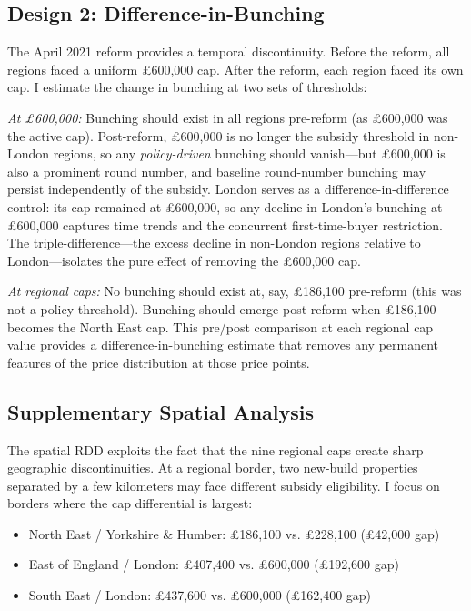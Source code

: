 \documentclass[12pt]{article}
\begin{document}
\subsection{Design 2: Difference-in-Bunching}

The April 2021 reform provides a temporal discontinuity. Before the reform, all regions faced a uniform \pounds600,000 cap. After the reform, each region faced its own cap. I estimate the change in bunching at two sets of thresholds:

\textit{At \pounds600,000:} Bunching should exist in all regions pre-reform (as \pounds600,000 was the active cap). Post-reform, \pounds600,000 is no longer the subsidy threshold in non-London regions, so any \textit{policy-driven} bunching should vanish---but \pounds600,000 is also a prominent round number, and baseline round-number bunching may persist independently of the subsidy. London serves as a difference-in-difference control: its cap remained at \pounds600,000, so any decline in London's bunching at \pounds600,000 captures time trends and the concurrent first-time-buyer restriction. The triple-difference---the excess decline in non-London regions relative to London---isolates the pure effect of removing the \pounds600,000 cap.

\textit{At regional caps:} No bunching should exist at, say, \pounds186,100 pre-reform (this was not a policy threshold). Bunching should emerge post-reform when \pounds186,100 becomes the North East cap. This pre/post comparison at each regional cap value provides a difference-in-bunching estimate that removes any permanent features of the price distribution at those price points.

\subsection{Supplementary Spatial Analysis}

The spatial RDD exploits the fact that the nine regional caps create sharp geographic discontinuities. At a regional border, two new-build properties separated by a few kilometers may face different subsidy eligibility. I focus on borders where the cap differential is largest:

\begin{itemize}
\item North East / Yorkshire \& Humber: \pounds186,100 vs. \pounds228,100 (\pounds42,000 gap)
\item East of England / London: \pounds407,400 vs. \pounds600,000 (\pounds192,600 gap)
\item South East / London: \pounds437,600 vs. \pounds600,000 (\pounds162,400 gap)
\end{itemize}
\end{document}
